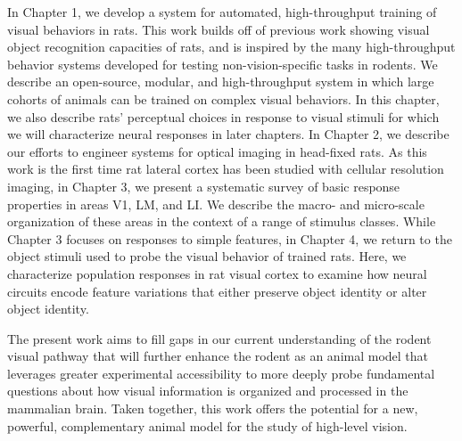 In Chapter 1, we develop a system for automated, high-throughput training of visual behaviors in rats. This work builds off of previous work showing visual object recognition capacities of rats, and is inspired by the many high-throughput behavior systems developed for testing non-vision-specific tasks in rodents. We describe an open-source, modular, and high-throughput system in which large cohorts of animals can be trained on complex visual behaviors. In this chapter, we also describe rats' perceptual choices in response to visual stimuli for which we will characterize neural responses in later chapters. In Chapter 2, we describe our efforts to engineer systems for optical imaging in head-fixed rats. As this work is the first time rat lateral cortex has been studied with cellular resolution imaging, in Chapter 3, we present a systematic survey of basic response properties in areas V1, LM, and LI. We describe the macro- and micro-scale organization of these areas in the context of a range of stimulus classes. While Chapter 3 focuses on responses to simple features, in Chapter 4, we return to the object stimuli used to probe the visual behavior of trained rats. Here, we characterize population responses in rat visual cortex to examine how neural circuits encode feature variations that either preserve object identity or alter object identity. 

The present work aims to fill gaps in our current understanding of the rodent visual pathway that will further enhance the rodent as an animal model that leverages greater experimental accessibility to more deeply probe fundamental questions about how visual information is organized and processed in the mammalian brain. Taken together, this work offers the potential for a new, powerful, complementary animal model for the study of high-level vision.




